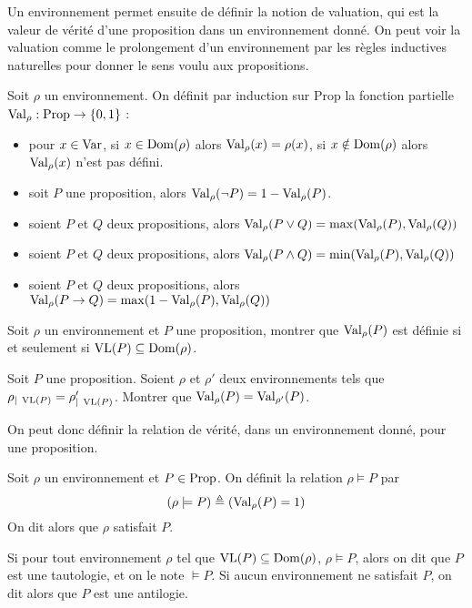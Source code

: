 Un environnement permet ensuite de définir la notion de valuation, qui est la
valeur de vérité d'une proposition dans un environnement donné. On peut voir
la valuation comme le prolongement d'un environnement par les règles inductives
naturelles pour donner le sens voulu aux propositions.

\begin{definition}[Valuation]
  Soit $\rho$ un environnement. On définit par induction sur $\mathrm{Prop}$
  la fonction partielle $\operatorname{Val}_\rho : \operatorname{Prop} \to \{0,1\}$ :
  \begin{itemize}
  \item pour $x\in \operatorname{Var}$, si $x\in \operatorname{Dom}(\rho)$ alors
    $\operatorname{Val}_\rho (x)= \rho(x)$, si $x\notin \operatorname{Dom}(\rho)$ alors
    $\operatorname{Val}_\rho (x)$ n'est pas défini.
  \item soit $P$ une proposition, alors
    $\operatorname{Val}_\rho(\lnot P) = 1 - \operatorname{Val}_\rho(P)$.
  \item soient $P$ et $Q$ deux propositions, alors
    $\operatorname{Val}_\rho(P\lor Q)=\max(\operatorname{Val}_\rho(P),\operatorname{Val}_\rho(Q))$
  \item soient $P$ et $Q$ deux propositions, alors
    $\operatorname{Val}_\rho(P\land Q)=\min(\operatorname{Val}_\rho(P),\operatorname{Val}_\rho(Q))$
  \item soient $P$ et $Q$ deux propositions, alors
    $\operatorname{Val}_\rho(P\to Q) = \max(1 - \operatorname{Val}_\rho(P),\operatorname{Val}_\rho(Q))$
  \end{itemize}
\end{definition}

\begin{exercise}
  Soit $\rho$ un environnement et $P$ une proposition, montrer que
  $\operatorname{Val}_\rho(P)$ est définie si et seulement si
  $\operatorname{VL}(P)\subseteq \operatorname{Dom}(\rho)$.
\end{exercise}

\begin{exercise}\label{exo.val.VL}
  Soit $P$ une proposition. Soient $\rho$ et $\rho'$ deux environnements tels
  que $\rho_{|\;\operatorname{VL}(P)}=\rho'_{|\;\operatorname{VL}(P)}$. Montrer que
  $\operatorname{Val}_\rho(P)=\operatorname{Val}_{\rho'}(P)$.
\end{exercise}

On peut donc définir la relation de vérité, dans un environnement donné, pour
une proposition.

\begin{definition}[Satisfaction]
  Soit $\rho$ un environnement et $P\in\operatorname{Prop}$. On définit la relation
  $\rho\models P$ par $$(\rho\models P) \triangleq (\operatorname{Val}_\rho(P) = 1)$$
  On dit alors que $\rho$ satisfait $P$.

  Si pour tout environnement $\rho$ tel que $\operatorname{VL}(P)\subseteq\operatorname{Dom}(\rho)$,
  $\rho\models P$, alors on dit que $P$ est une tautologie, et on le note
  $\models P$. Si aucun environnement ne satisfait $P$, on dit alors que $P$ est
  une antilogie.
\end{definition}

